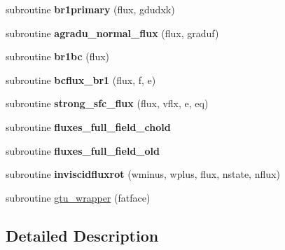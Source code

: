\begin{DoxyCompactItemize}
\item 
\hypertarget{group__flux_ga549c3560ff566ecc4ebe5a26cd8d7434}{subroutine {\bfseries br1primary} (flux, gdudxk)}\label{group__flux_ga549c3560ff566ecc4ebe5a26cd8d7434}

\item 
\hypertarget{group__flux_gaf5460e23edcfc140cce7884a9e3ebdac}{subroutine {\bfseries agradu\-\_\-normal\-\_\-flux} (flux, graduf)}\label{group__flux_gaf5460e23edcfc140cce7884a9e3ebdac}

\item 
\hypertarget{group__flux_gaf39815444396f97adffa0273bf02d6e5}{subroutine {\bfseries br1bc} (flux)}\label{group__flux_gaf39815444396f97adffa0273bf02d6e5}

\item 
\hypertarget{group__flux_gad4b2470bb6d756ae16a22aa09bff20cd}{subroutine {\bfseries bcflux\-\_\-br1} (flux, f, e)}\label{group__flux_gad4b2470bb6d756ae16a22aa09bff20cd}

\item 
\hypertarget{group__flux_gadcea35e25dbe44ed6a9f9816974a8dc7}{subroutine {\bfseries strong\-\_\-sfc\-\_\-flux} (flux, vflx, e, eq)}\label{group__flux_gadcea35e25dbe44ed6a9f9816974a8dc7}

\item 
\hypertarget{group__flux_ga565a7f26aa4697a900499931ca224e37}{subroutine {\bfseries fluxes\-\_\-full\-\_\-field\-\_\-chold}}\label{group__flux_ga565a7f26aa4697a900499931ca224e37}

\item 
\hypertarget{group__flux_gade9f72409b237ebd1810b9d856f2c0d2}{subroutine {\bfseries fluxes\-\_\-full\-\_\-field\-\_\-old}}\label{group__flux_gade9f72409b237ebd1810b9d856f2c0d2}

\item 
\hypertarget{group__flux_gae3c480e559a6d01be27381e8517a210d}{subroutine {\bfseries inviscidfluxrot} (wminus, wplus, flux, nstate, nflux)}\label{group__flux_gae3c480e559a6d01be27381e8517a210d}

\item 
subroutine \hyperlink{group__flux_gab4541d3a9fc0c10583e47fa4b6cc9f2d}{gtu\-\_\-wrapper} (fatface)
\end{DoxyCompactItemize}


\subsection{Detailed Description}


